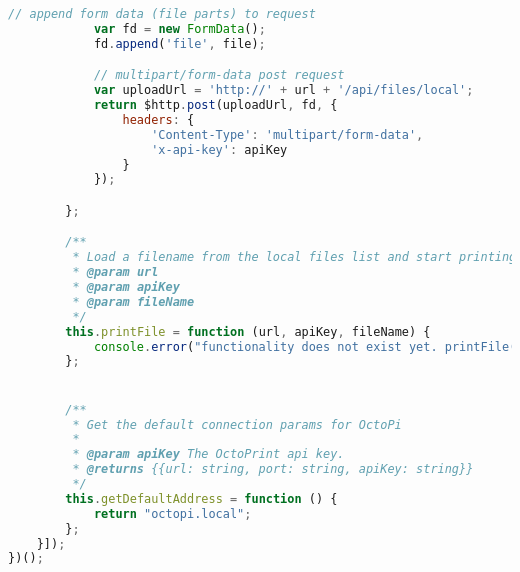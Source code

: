 \begin{lstlisting}[language=JavaScript, label={lst:octoprintService}, caption=This file wrapped the octoprint API so that it could be easily integrated with the controller.]
            // append form data (file parts) to request
            var fd = new FormData();
            fd.append('file', file);

            // multipart/form-data post request
            var uploadUrl = 'http://' + url + '/api/files/local';
            return $http.post(uploadUrl, fd, {
                headers: {
                    'Content-Type': 'multipart/form-data',
                    'x-api-key': apiKey
                }
            });

        };

        /**
         * Load a filename from the local files list and start printing it right now
         * @param url
         * @param apiKey
         * @param fileName
         */
        this.printFile = function (url, apiKey, fileName) {
            console.error("functionality does not exist yet. printFile()");
        };


        /**
         * Get the default connection params for OctoPi
         *
         * @param apiKey The OctoPrint api key.
         * @returns {{url: string, port: string, apiKey: string}}
         */
        this.getDefaultAddress = function () {
            return "octopi.local";
        };
    }]);
})();
\end{lstlisting}

